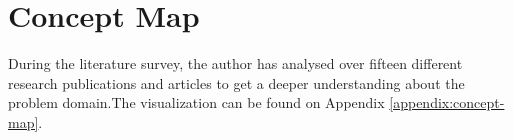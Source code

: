 \section{Concept Map}

During the literature survey, the author has analysed over fifteen different research publications and articles to get a deeper understanding about the problem domain.The visualization can be found on Appendix \ref{appendix:concept-map}.

